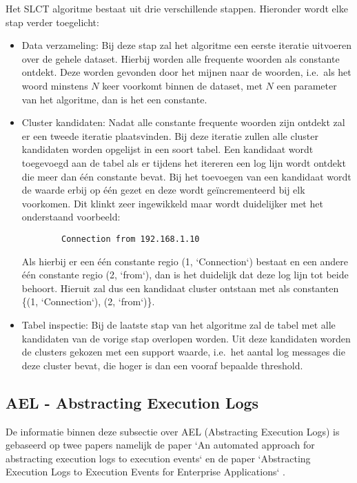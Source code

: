 Het SLCT algoritme bestaat uit drie verschillende stappen. Hieronder wordt elke stap verder toegelicht:
\begin{itemize}
    \item Data verzameling: Bij deze stap zal het algoritme een eerste iteratie uitvoeren over de gehele dataset. Hierbij worden alle frequente woorden als constante ontdekt. Deze worden gevonden door het mijnen naar de woorden, i.e.\ als het woord minstens $N$ keer voorkomt binnen de dataset, met $N$ een parameter van het algoritme, dan is het een constante.\\
    
    \item Cluster kandidaten: Nadat alle constante frequente woorden zijn ontdekt zal er een tweede iteratie plaatsvinden. Bij deze iteratie zullen alle cluster kandidaten worden opgelijst in een soort tabel. Een kandidaat wordt toegevoegd aan de tabel als er tijdens het itereren een log lijn wordt ontdekt die meer dan één constante bevat. Bij het toevoegen van een kandidaat wordt de waarde erbij op één gezet en deze wordt geïncrementeerd bij elk voorkomen. Dit klinkt zeer ingewikkeld maar wordt duidelijker met het onderstaand voorbeeld:
    \begin{verbatim}
        Connection from 192.168.1.10
    \end{verbatim}
    Als hierbij er een één constante regio (1, `Connection`) bestaat en een andere één constante regio (2, `from`), dan is het duidelijk dat deze log lijn tot beide behoort. Hieruit zal dus een kandidaat cluster ontstaan met als constanten \{(1, `Connection`), (2, `from`)\}.\\
    \item Tabel inspectie: Bij de laatste stap van het algoritme zal de tabel met alle kandidaten van de vorige stap overlopen worden. Uit deze kandidaten worden de clusters gekozen met een support waarde, i.e.\ het aantal log messages die deze cluster bevat, die hoger is dan een vooraf bepaalde threshold.
\end{itemize}

\subsection{AEL -  Abstracting Execution Logs}
De informatie binnen deze subsectie over AEL (Abstracting Execution Logs) is gebaseerd op twee papers namelijk de paper `An automated approach for abstracting execution logs to execution events` \autocite{jiang2008automated} en de paper `Abstracting Execution Logs to Execution Events for Enterprise Applications` \autocite{jiang2008abstracting}. 

